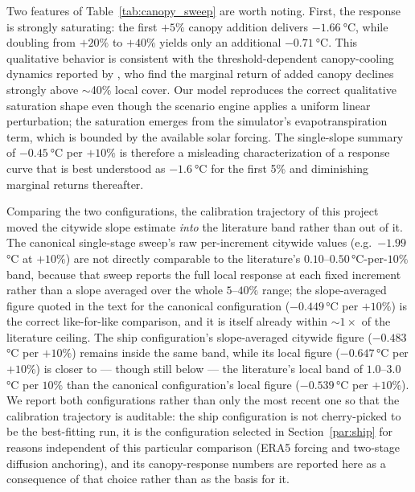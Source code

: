 \documentclass[12pt, letterpaper]{article}
\begin{document}
Two features of Table~\ref{tab:canopy_sweep} are worth noting. First, the
response is strongly saturating: the first $+5\%$ canopy addition delivers
$\SI{-1.66}{\degreeCelsius}$, while doubling from $+20\%$ to $+40\%$ yields
only an additional $\SI{-0.71}{\degreeCelsius}$. This qualitative behavior
is consistent with the threshold-dependent canopy-cooling dynamics reported
by \citet{ziter2019scale}, who find the marginal return of added canopy
declines strongly above $\sim$40\% local cover. Our model reproduces
the correct qualitative saturation shape even though the scenario engine
applies a uniform linear perturbation; the saturation emerges from the
simulator's evapotranspiration term, which is bounded by the available
solar forcing. The single-slope summary of $\SI{-0.45}{\degreeCelsius}$
per $+10\%$ is therefore a misleading characterization of a response curve
that is best understood as $\SI{-1.6}{\degreeCelsius}$ for the first 5\%
and diminishing marginal returns thereafter.

Comparing the two configurations, the calibration trajectory of this project
moved the citywide slope estimate \emph{into} the literature band rather
than out of it. The canonical single-stage sweep's raw per-increment citywide
values (e.g.\ $-1.99$\,°C at $+10\%$) are not directly comparable to the
literature's $0.10$--$0.50$\,°C-per-$10\%$ band, because that sweep reports
the full local response at each fixed increment rather than a slope averaged
over the whole $5$--$40\%$ range; the slope-averaged figure quoted in the
text for the canonical configuration ($-0.449$\,°C per $+10\%$) is the
correct like-for-like comparison, and it is itself already within
$\sim1\times$ of the literature ceiling. The ship configuration's
slope-averaged citywide figure ($-0.483$\,°C per $+10\%$) remains inside
the same band, while its local figure ($-0.647$\,°C per $+10\%$) is closer
to — though still below — the literature's local band of $1.0$--$3.0$\,°C
per $10\%$ than the canonical configuration's local figure
($-0.539$\,°C per $+10\%$). We report both configurations rather than only
the most recent one so that the calibration trajectory is auditable: the
ship configuration is not cherry-picked to be the best-fitting run, it is
the configuration selected in Section~\ref{par:ship} for reasons independent
of this particular comparison (ERA5 forcing and two-stage diffusion
anchoring), and its canopy-response numbers are reported here as a
consequence of that choice rather than as the basis for it.
\end{document}
